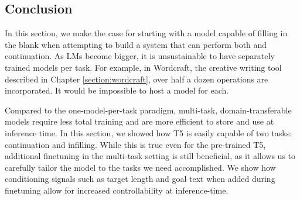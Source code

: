 \subsection{Conclusion}
In this section, we make the case for starting with a model capable of filling in the blank when attempting to build a system that can perform both \FitB{} and continuation.
As LMs become bigger, it is unsustainable to have separately trained models per task.
For example, in Wordcraft, the creative writing tool described in Chapter \ref{section:wordcraft}, over half a dozen operations are incorporated.
It would be impossible to host a model for each.

Compared to the one-model-per-task paradigm, multi-task, domain-transferable models require less total training and are more efficient to store and use at inference time.
In this section, we showed how T5 is easily capable of two tasks: continuation and infilling.
While this is true even for the pre-trained T5, additional finetuning in the multi-task setting is still beneficial, as it allows us to carefully tailor the model to the tasks we need accomplished.
We show how conditioning signals such as target length and goal text when added during finetuning allow for increased controllability at inference-time.



